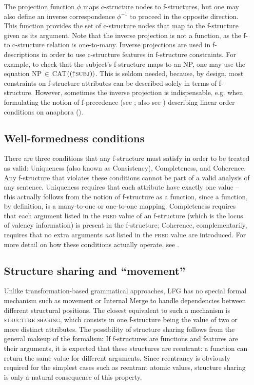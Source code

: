 \documentclass[output=paper]{langscibook}
\begin{document}
 The projection function $\phi$ maps c-structure nodes to f-structures, but one may also define an inverse correspondence $\phi^{-1}$ to proceed in the opposite direction. This function provides the set of c-structure nodes that map to the f-structure given as its argument. Note that the inverse projection is not a function, as the f- to c-structure relation is one-to-many. Inverse projections are used in f-descriptions in order to use c-structure features in f-structure constraints. For example, to check that the subject's f-structure maps to an NP, one may use the equation {NP}\,$\in$\,{CAT}$\left(\left(\mbox{$\uparrow$}{}\textsc{subj}{}\right)\right)$. This is seldom needed, because, by design, most constraints on f-structure attributes can be described solely in terms of f-structure. However, sometimes the inverse projection is indispensable, e.g. when formulating the notion of f-precedence (see \citealt{kaplan-zaenen1989-fprec}; also see ) describing linear order conditions on anaph\-o\-ra ().
 
 \subsection{Well-formedness conditions\label{sect:intro:conditions}}
 
 There are three conditions that any f-structure must satisfy in order to be treated as valid: Uniqueness (also known as Consistency), Completeness, and Coherence. Any f-structure that violates these conditions cannot be part of a valid analysis of any sentence. Uniqueness requires that each attribute have exactly one value -- this actually follows from the notion of f-structure as a function, since a function, by definition, is a many-to-one or one-to-one mapping. Completeness requires that each argument listed in the \textsc{pred} value of an f-structure (which is the locus of valency information) is present in the f-structure; Coherence, complementarily, requires that no extra arguments \textit{not} listed in the \textsc{pred} value are introduced. For more detail on how these conditions actually operate, see . 
 
 \subsection{Structure sharing and ``movement''\label{sect:intro:sharing}}
 
 Unlike transformation-based grammatical approaches, LFG has no special formal mechanism such as movement or Internal Merge to handle dependencies between different structural positions. The closest equivalent to such a mechanism is \textsc{structure sharing}, which consists in one f-structure being the value of two or more distinct attributes. The possibility of structure sharing follows from the general makeup of the formalism: If f-structures are functions and features are their arguments, it is expected that these structures are reentrant: a function can return the same value for different arguments. Since reentrancy is obviously required for the simplest cases such as reentrant atomic values, structure sharing is only a natural consequence of this property.
 
\end{document}
